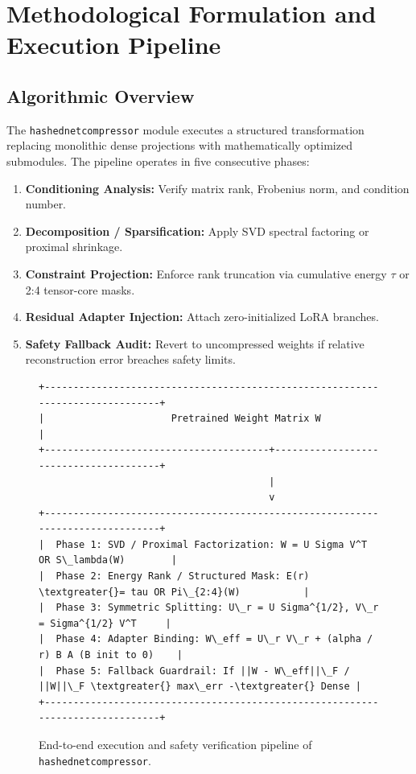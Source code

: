 \section{Methodological Formulation and Execution Pipeline}

\subsection{Algorithmic Overview}
The \texttt{hashednetcompressor} module executes a structured transformation replacing monolithic dense projections with mathematically optimized submodules. The pipeline operates in five consecutive phases:
\begin{enumerate}
\item \textbf{Conditioning Analysis:} Verify matrix rank, Frobenius norm, and condition number.
\item \textbf{Decomposition / Sparsification:} Apply SVD spectral factoring or proximal shrinkage.
\item \textbf{Constraint Projection:} Enforce rank truncation via cumulative energy $\tau$ or 2:4 tensor-core masks.
\item \textbf{Residual Adapter Injection:} Attach zero-initialized LoRA branches.
\item \textbf{Safety Fallback Audit:} Revert to uncompressed weights if relative reconstruction error breaches safety limits.
\end{enumerate}

\begin{figure}[t]
\centering
\begin{verbatim}
+-------------------------------------------------------------------------------+
|                      Pretrained Weight Matrix W                               |
+---------------------------------------+---------------------------------------+
                                        |
                                        v
+-------------------------------------------------------------------------------+
|  Phase 1: SVD / Proximal Factorization: W = U Sigma V^T OR S\_lambda(W)        |
|  Phase 2: Energy Rank / Structured Mask: E(r) \textgreater{}= tau OR Pi\_{2:4}(W)           |
|  Phase 3: Symmetric Splitting: U\_r = U Sigma^{1/2}, V\_r = Sigma^{1/2} V^T     |
|  Phase 4: Adapter Binding: W\_eff = U\_r V\_r + (alpha / r) B A (B init to 0)    |
|  Phase 5: Fallback Guardrail: If ||W - W\_eff||\_F / ||W||\_F \textgreater{} max\_err -\textgreater{} Dense |
+-------------------------------------------------------------------------------+
\end{verbatim}
\caption{End-to-end execution and safety verification pipeline of \texttt{hashednetcompressor}.}
\end{figure}

